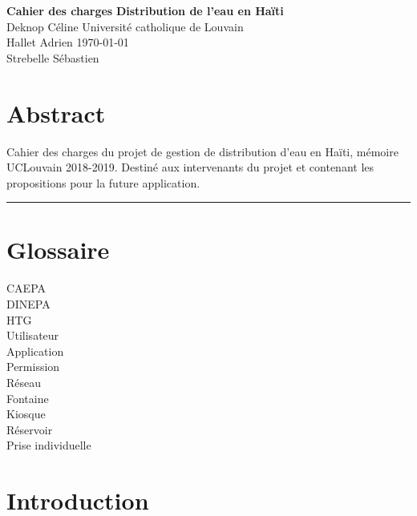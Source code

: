 \documentclass[a4paper, 11pt]{article}
\begin{document}
\noindent
\large\textbf{Cahier des charges} \hfill \textbf{Distribution de l'eau en Haïti} \\
\normalsize Deknop Céline \hfill Université catholique de Louvain \\
Hallet Adrien \hfill \today \\
Strebelle Sébastien

\section*{Abstract}
Cahier des charges du projet de gestion de distribution d'eau en Haïti, mémoire UCLouvain 2018-2019. Destiné aux intervenants du projet et contenant les propositions pour la future application.
\hrule
\section{Glossaire}
  \begin{description} %
    \item[CAEPA]
    \item[DINEPA]
    \item[HTG]
    \item[Utilisateur]
    \item[Application]
    \item[Permission]
    \item[Réseau]
    \item[Fontaine]
    \item[Kiosque]
    \item[Réservoir]
    \item[Prise individuelle]
  \end{description}
\section{Introduction}
\end{document}
